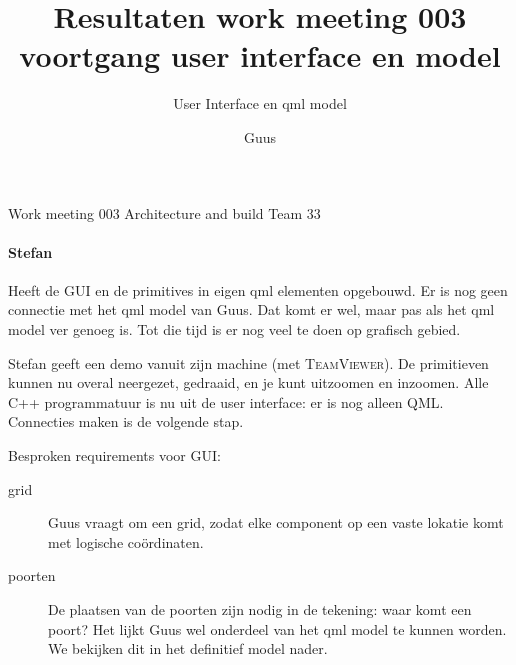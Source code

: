 \documentclass[a4paper,final]{article}
\title{Resultaten work meeting 003 voortgang user interface en model }
\author{Guus}
\begin{document}

\newcommand{\Noc}{\textsc{NoC}\xspace}

\begin{Minutes}{Work meeting 003 Architecture and build Team 33}
\subtitle{User Interface en qml model}

\maketitle%

\newcommand{\w}[1]{\textsc{#1}\xspace}
\newcommand{\qml}{\textsc{QML}\xspace}
\newcommand{\qt}{\textsc{Qt}\xspace}
\newcommand{\qtquick}{\textsc{QtQuick}\xspace}
\newcommand{\tv}{\textsc{TeamViewer}\xspace}
\newcommand{\cpp}{\textsc{C++}\xspace}



\paragraph{Stefan} Heeft de GUI en de primitives in eigen qml elementen
opgebouwd. Er is nog geen connectie met het qml model van Guus. Dat komt er
wel, maar pas als het qml model ver genoeg is. Tot die tijd is er nog veel te
doen op grafisch gebied.

Stefan geeft een demo vanuit zijn machine (met \tv). De primitieven kunnen nu
overal neergezet, gedraaid, en je kunt uitzoomen en inzoomen.  Alle \cpp
programmatuur is nu uit de user interface: er is nog alleen \qml. Connecties
maken is de volgende stap.

Besproken requirements voor GUI:

\begin{description}

	\item[grid] Guus vraagt om een grid, zodat elke component op een vaste
		lokatie komt met logische co\"{o}rdinaten.

	\item[poorten] De plaatsen van de poorten zijn nodig in de tekening: waar
		komt een poort?  Het lijkt Guus wel onderdeel van het qml model te
		kunnen worden.  We bekijken dit in het definitief model nader.

\end{description}


\end{Minutes}
\end{document}
